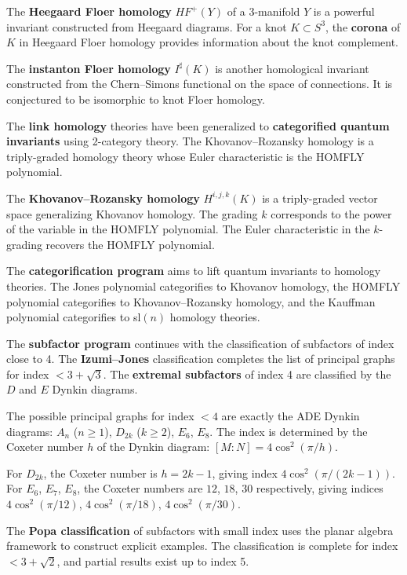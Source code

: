The \textbf{Heegaard Floer homology} $HF^+(Y)$ of a 3-manifold $Y$ is a powerful invariant constructed from Heegaard diagrams. For a knot $K \subset S^3$, the \textbf{corona} of $K$ in Heegaard Floer homology provides information about the knot complement.

The \textbf{instanton Floer homology} $I^\sharp(K)$ is another homological invariant constructed from the Chern--Simons functional on the space of connections. It is conjectured to be isomorphic to knot Floer homology.

The \textbf{link homology} theories have been generalized to \textbf{categorified quantum invariants} using 2-category theory. The Khovanov--Rozansky homology is a triply-graded homology theory whose Euler characteristic is the HOMFLY polynomial.

The \textbf{Khovanov--Rozansky homology} $H^{i,j,k}(K)$ is a triply-graded vector space generalizing Khovanov homology. The grading $k$ corresponds to the power of the variable in the HOMFLY polynomial. The Euler characteristic in the $k$-grading recovers the HOMFLY polynomial.

The \textbf{categorification program} aims to lift quantum invariants to homology theories. The Jones polynomial categorifies to Khovanov homology, the HOMFLY polynomial categorifies to Khovanov--Rozansky homology, and the Kauffman polynomial categorifies to sl$(n)$ homology theories.

The \textbf{subfactor program} continues with the classification of subfactors of index close to 4. The \textbf{Izumi--Jones} classification completes the list of principal graphs for index $< 3 + \sqrt{3}$. The \textbf{extremal subfactors} of index 4 are classified by the $D$ and $E$ Dynkin diagrams.

The possible principal graphs for index $< 4$ are exactly the ADE Dynkin diagrams: $A_n$ ($n \geq 1$), $D_{2k}$ ($k \geq 2$), $E_6$, $E_8$. The index is determined by the Coxeter number $h$ of the Dynkin diagram: $[M:N] = 4\cos^2(\pi/h)$.

For $D_{2k}$, the Coxeter number is $h = 2k-1$, giving index $4\cos^2(\pi/(2k-1))$. For $E_6$, $E_7$, $E_8$, the Coxeter numbers are $12$, $18$, $30$ respectively, giving indices $4\cos^2(\pi/12)$, $4\cos^2(\pi/18)$, $4\cos^2(\pi/30)$.

The \textbf{Popa classification} of subfactors with small index uses the planar algebra framework to construct explicit examples. The classification is complete for index $< 3 + \sqrt{2}$, and partial results exist up to index 5.

